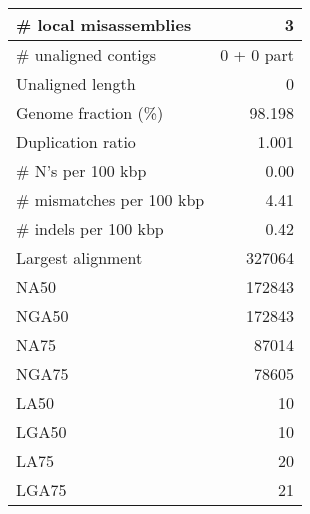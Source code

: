 \documentclass[12pt,a4paper]{article}
\begin{document}
\begin{table}[ht]
\begin{center}
\begin{tabular}{|l*{1}{|r}|}
\# local misassemblies & 3 \\ \hline
\# unaligned contigs & 0 + 0 part \\ \hline
Unaligned length & 0 \\ \hline
Genome fraction (\%) & 98.198 \\ \hline
Duplication ratio & 1.001 \\ \hline
\# N's per 100 kbp & 0.00 \\ \hline
\# mismatches per 100 kbp & 4.41 \\ \hline
\# indels per 100 kbp & 0.42 \\ \hline
Largest alignment & 327064 \\ \hline
NA50 & 172843 \\ \hline
NGA50 & 172843 \\ \hline
NA75 & 87014 \\ \hline
NGA75 & 78605 \\ \hline
LA50 & 10 \\ \hline
LGA50 & 10 \\ \hline
LA75 & 20 \\ \hline
LGA75 & 21 \\ \hline
\end{tabular}
\end{center}
\end{table}
\end{document}
